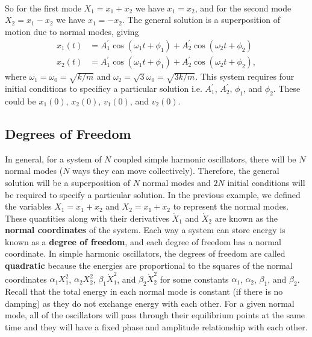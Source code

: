 \documentclass[../classical_mechanics.tex]{subfiles}
\begin{document}
\begin{example}
\begin{align}
            \end{align}
            So for the first mode $X_1=x_1+x_2$ we have $x_1=x_2$, and for the second mode $X_2=x_1-x_2$ we have $x_1=-x_2$.
            The general solution is a superposition of motion due to normal modes, giving
            \begin{align}
                x_1(t)&=A_1^\prime\cos(\omega_1 t+\phi_1)+A_2^\prime\cos(\omega_2 t+\phi_2)\\
                x_2(t)&=A_1^\prime\cos(\omega_1 t+\phi_1)+A_2^\prime\cos(\omega_2 t+\phi_2),
            \end{align}
            where $\omega_1=\omega_0=\sqrt{k/m}$ and $\omega_2=\sqrt{3}\omega_0=\sqrt{3k/m}$.
            This system requires four initial conditions to specificy a particular solution i.e. $A_1^\prime$, $A_2^\prime$, $\phi_1$, and $\phi_2$.
            These could be $x_1(0)$, $x_2(0)$, $v_1(0)$, and $v_2(0)$.
        \end{example}

        \subsection{Degrees of Freedom}\label{subsec:degrees-of-freedom}
            In general, for a system of $N$ coupled simple harmonic oscillators, there will be $N$ normal modes ($N$ ways they can move collectively).
            Therefore, the general solution will be a superposition of $N$ normal modes and $2N$ initial conditions will be required to specify a particular solution.
            In the previous example, we defined the variables $X_1=x_1+x_2$ and $X_2=x_1+x_2$ to represent the normal modes.
            These quantities along with their derivatives $\dot{X}_1$ and $\dot{X}_2$ are known as the \textbf{normal coordinates} of the system.
            Each way a system can store energy is known as a \textbf{degree of freedom}, and each degree of freedom has a normal coordinate.
            In simple harmonic oscillators, the degrees of freedom are called \textbf{quadratic} because the energies are proportional to the squares of the normal coordinates $\alpha_1X_1^2$, $\alpha_2X_2^2$, $\beta_1\dot{X}_1^2$, and $\beta_2\dot{X}_2^2$ for some constants $\alpha_1$, $\alpha_2$, $\beta_1$, and $\beta_2$.
            Recall that the total energy in each normal mode is constant (if there is no damping) as they do not exchange energy with each other.
            For a given normal mode, all of the oscillators will pass through their equilibrium points at the same time and they will have a fixed phase and amplitude relationship with each other.

\end{document}
